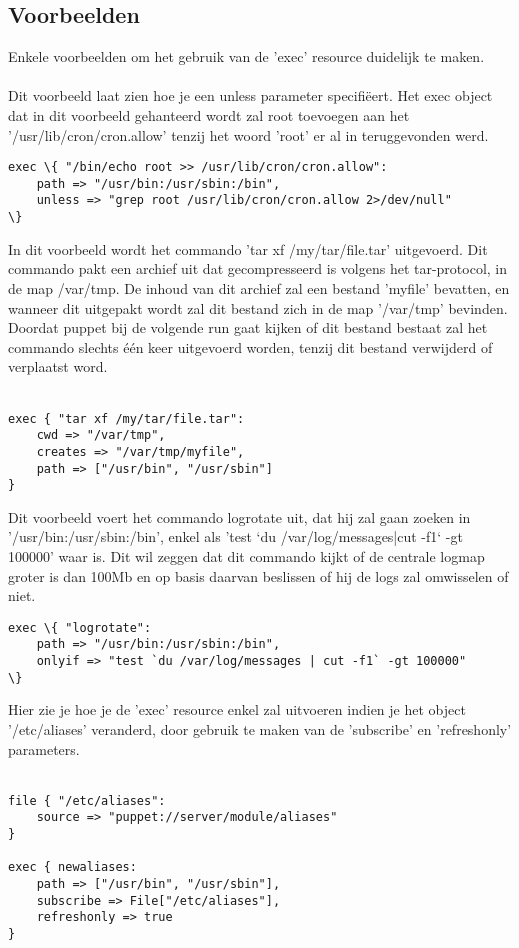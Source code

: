 \subsection{Voorbeelden}
Enkele voorbeelden om het gebruik van de 'exec' resource duidelijk te maken.\\\\
%
Dit voorbeeld laat zien hoe je een unless parameter specifi\"{e}ert. Het exec object dat in dit voorbeeld gehanteerd wordt zal root toevoegen aan het '/usr/lib/cron/cron.allow' tenzij het woord 'root' er al in teruggevonden werd.
%
\begin{code}
\begin{lstlisting}
exec \{ "/bin/echo root >> /usr/lib/cron/cron.allow":
	path => "/usr/bin:/usr/sbin:/bin",
	unless => "grep root /usr/lib/cron/cron.allow 2>/dev/null"
\}
\end{lstlisting}
\end{code}
%
In dit voorbeeld wordt het commando 'tar xf /my/tar/file.tar' uitgevoerd. Dit commando pakt een archief uit dat gecompresseerd is volgens het tar-protocol, in de map /var/tmp. De inhoud van dit archief zal een bestand 'myfile' bevatten, en wanneer dit uitgepakt wordt zal dit bestand zich in de map '/var/tmp' bevinden. Doordat puppet bij de volgende run gaat kijken of dit bestand bestaat zal het commando slechts \'e\'en keer uitgevoerd worden, tenzij dit bestand verwijderd of verplaatst word.\\\\
%
\begin{code}
\begin{lstlisting}
exec { "tar xf /my/tar/file.tar":
	cwd => "/var/tmp",
	creates => "/var/tmp/myfile",
	path => ["/usr/bin", "/usr/sbin"]
}
\end{lstlisting}
\end{code}
%
Dit voorbeeld voert het commando logrotate uit, dat hij zal gaan zoeken in '/usr/bin:/usr/sbin:/bin', enkel als 'test `du /var/log/messages|cut -f1` -gt 100000' waar is.
Dit wil zeggen dat dit commando kijkt of de centrale logmap groter is dan 100Mb en op basis daarvan beslissen of hij de logs zal omwisselen of niet.
%
\begin{code}
\begin{lstlisting}
exec \{ "logrotate":
	path => "/usr/bin:/usr/sbin:/bin",
	onlyif => "test `du /var/log/messages | cut -f1` -gt 100000"
\}
\end{lstlisting}
\end{code}
%
Hier zie je hoe je de 'exec' resource enkel zal uitvoeren indien je het object '/etc/aliases' veranderd, door gebruik te maken van de 'subscribe' en 'refreshonly' parameters.\\\\
%
\begin{code}
\begin{lstlisting}
file { "/etc/aliases":
	source => "puppet://server/module/aliases"
}

exec { newaliases:
	path => ["/usr/bin", "/usr/sbin"],
	subscribe => File["/etc/aliases"],
	refreshonly => true
}
\end{lstlisting}
\end{code}
